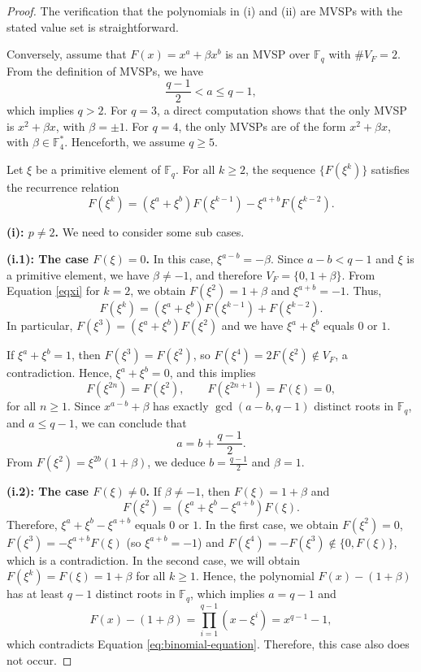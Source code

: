 \documentclass[10pt,a4paper]{amsart}
\begin{document}
\begin{proof}
The verification that the polynomials in {\rm (i)} and {\rm (ii)} are MVSPs with the stated value set is straightforward.

Conversely, assume that $F(x) = x^a + \beta x^b$ is an MVSP over $\mathbb{F}_q$ with $\#V_F = 2$. From the definition of MVSPs, we have
\[
\frac{q-1}{2} < a \leq q-1,
\]
which implies $q > 2$. For $q = 3$, a direct computation shows that the only MVSP is $x^2 + \beta x$, with $\beta = \pm 1$.
For $q = 4$, the only MVSPs are of the form $x^2 + \beta x$, with $\beta \in \mathbb{F}_4^*$. Henceforth, we assume $q \ge 5$.

Let $\xi$ be a primitive element of $\mathbb{F}_q$. For all $k \ge 2$, the sequence $\{F(\xi^k)\}$ satisfies the recurrence relation
\begin{equation}\label{eqxi}
F(\xi^k) = (\xi^a + \xi^b)F(\xi^{k-1}) - \xi^{a+b}F(\xi^{k-2}).
\end{equation}

\medskip

\noindent
\textbf{(i): $p \neq 2$.} We need to consider some sub cases.

\noindent
\textbf{(i.1): The case $F(\xi) = 0$.}
In this case, $\xi^{a-b} = -\beta$. Since $a-b < q-1$ and $\xi$ is a primitive element, we have $\beta \neq -1$, and therefore $V_F = \{0, 1+\beta\}$. From Equation \eqref{eqxi} for $k=2$, we obtain $F(\xi^2)=1+\beta$ and $\xi^{a+b}=-1$. Thus,
\[
F(\xi^k) = (\xi^a+\xi^b)F(\xi^{k-1}) + F(\xi^{k-2}).
\]
In particular, $F(\xi^3) = (\xi^a + \xi^b)F(\xi^2)$ and we have $\xi^a + \xi^b$ equals $0$ or $1$.

If $\xi^a+\xi^b = 1$, then $F(\xi^3) = F(\xi^2)$, so $F(\xi^4)=2F(\xi^2)\notin V_F$, a contradiction. Hence, $\xi^a+\xi^b=0$, and this implies
\[
F(\xi^{2n}) = F(\xi^2), \qquad F(\xi^{2n+1}) = F(\xi) = 0,
\]
for all $n \ge 1$. Since \( x^{a - b} + \beta \) has exactly \( \gcd(a - b, q - 1) \) distinct roots in \( \mathbb{F}_q \), and \( a \leq q - 1 \), we can conclude that
$$
a = b + \frac{q - 1}{2}.
$$
From $F(\xi^2)=\xi^{2b}(1+\beta)$, we deduce $b = \frac{q-1}{2}$ and $\beta = 1$.

\smallskip

\noindent
\textbf{(i.2): The case $F(\xi) \neq 0$.}
If $\beta \neq -1$, then $F(\xi)=1+\beta$ and
\[
F(\xi^2) = (\xi^a+\xi^b-\xi^{a+b})F(\xi).
\]
Therefore, $\xi^a+\xi^b-\xi^{a+b}$ equals $0$ or $1$. In the first case, we obtain $F(\xi^2) = 0$, $F(\xi^3) = -\xi^{a + b} F(\xi)$ (so $\xi^{a + b} = -1$) and $F(\xi^4) = -F(\xi^3) \notin \{0, F(\xi)\}$, which is a contradiction. In the second case, we will obtain $F(\xi^k) = F(\xi) = 1 + \beta$ for all $k \geq 1$. Hence, the polynomial $F(x) - (1 + \beta)$ has at least $q - 1$ distinct roots in $\mathbb{F}_q$, which implies $a = q - 1$ and
  $$
  F(x) - (1 + \beta) = \prod_{i = 1}^{q - 1}(x - \xi^i) = x^{q - 1} - 1,
  $$
  which contradicts Equation \eqref{eq:binomial-equation}. Therefore, this case also does not occur. 
  

\end{proof}
\end{document}
